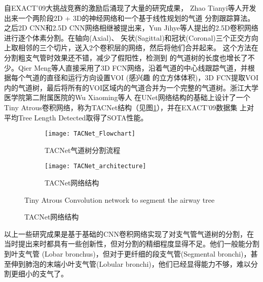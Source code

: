 	自EXACT'09大挑战竞赛的激励后涌现了大量的研究成果， Zhao Tianyi等人\cite{Zhao2019BronchusSA}开发出来一个两阶段2D + 3D的神经网络和一个基于线性规划的气道
	分割跟踪算法。之后2D CNN和2.5D CNN网络相继被提出来，Yun Jihye等人\cite{YUN201913}提出的2.5D卷积网络进行逐个体素分割。在轴向(Axial)、
	矢状(Sagittal)和冠状(Coronal)三个正交方向上取相邻的三个切片，送入2个卷积层的网络，然后将他们合并起来。 这个方法在分割粗支气管时效果还不错，减少了假阳性，检测到
	的气道树的长度也增长了不少。Qier Meng等人\cite{Meng2017TrackingAS}直接采用了3D FCN网络，沿着气道的中心线跟踪气道，并根据每个气道的直径和运行方向设置VOI
	(感兴趣	的立方体体积)，3D FCN提取VOI内的气道树，最后将所有的VOI区域内的气道合并为一个完整的气道树。浙江大学医学院第二附属医院的Wu Xiaoming等人
	\cite{Wu2021TACNet}在UNet网络结构的基础上设计了一个Tiny Atrous卷积网络，称为TACNet\cite{Wu2021TACNet}结构（见图\ref{fig:TACNet}），并在EXACT'09数据集
	上对平均Tree Length Detected取得了SOTA性能。
	\begin{figure}[!htp]
		\centering
		\begin{subfigure}{\textwidth}
			\centering
			\texttt{[image: TACNet\_Flowchart]}
			\caption{TACNet气道树分割流程}
		\end{subfigure}
		
		\vspace{5mm}
		
		\begin{subfigure}{\textwidth}
			\centering
			\texttt{[image: TACNet\_architecture]}
			\caption{TACNet网络结构}
		\end{subfigure}
			{Tiny Atrous Convolution network to segment the airway tree}
		\label{fig:TACNet}
	\end{figure}
	
	以上一些研究成果是基于基础的CNN卷积网络实现了对支气管气道树的分割，在当时提出来时都具有一些创新性，但对分割的精细程度显得不足。他们一般能分割到叶支气管
	(Lobar bronchus)，但对于更纤细的段支气管(Segmental bronchi)，甚至伸到肺泡的末端小叶支气管(Lobular bronchi)，他们已经显得能力不够，难以分割更细小的支气了。
	
